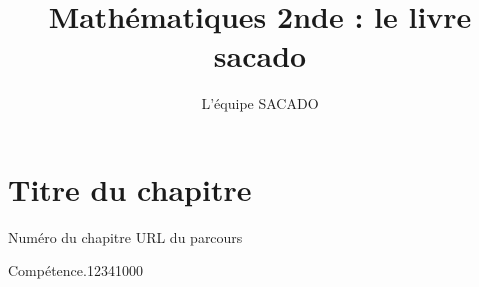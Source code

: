 


\usepackage{tkz-tab}

\title{Mathématiques 2nde  : le livre sacado}
\author{L'équipe SACADO}




\chapter{Titre du chapitre}{Numéro du chapitre}
{URL du parcours}
{
%

\begin{ExoDec}{Compétence.}{1234}{1}{0}{0}{0}
\vspace{.2cm}
%
%


\end{ExoDec}}
